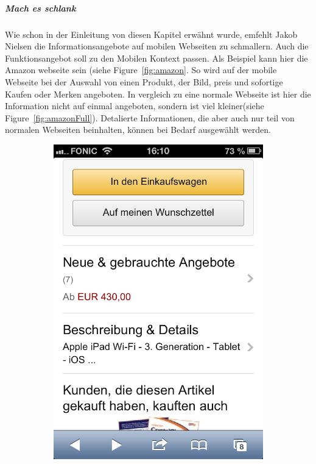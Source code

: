 \subparagraph{Mach es schlank} 
\label{subp:entferne_das_fett}

Wie schon in der Einleitung von diesen Kapitel erwähnt wurde, emfehlt Jakob Nielsen die Informationsangebote auf mobilen Webseiten zu schmallern. Auch die Funktionsangebot soll zu den Mobilen Kontext passen. Als Beispiel kann hier die Amazon webseite sein (siehe Figure~\ref{fig:amazon}. So wird auf der mobile Webseite bei der Auswahl von einen Produkt, der Bild, preis und sofortige Kaufen oder Merken angeboten. In vergleich zu eine normale Webseite ist hier die Information nicht auf einmal angeboten, sondern ist viel kleiner(siehe Figure~\ref{fig:amazonFull}). Detalierte Informationen, die aber auch nur teil von normalen Webseiten beinhalten, können bei Bedarf ausgewählt werden. 

\begin{figure}
	\centering
	\begin{subfigure}[b]{0.3\textwidth}
		\centering
		\includegraphics[width=1\textwidth]{img/amazon.png}

\end{subfigure}
\end{figure}
